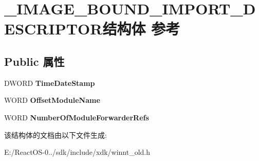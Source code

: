 \hypertarget{struct___i_m_a_g_e___b_o_u_n_d___i_m_p_o_r_t___d_e_s_c_r_i_p_t_o_r}{}\section{\+\_\+\+I\+M\+A\+G\+E\+\_\+\+B\+O\+U\+N\+D\+\_\+\+I\+M\+P\+O\+R\+T\+\_\+\+D\+E\+S\+C\+R\+I\+P\+T\+O\+R结构体 参考}
\label{struct___i_m_a_g_e___b_o_u_n_d___i_m_p_o_r_t___d_e_s_c_r_i_p_t_o_r}
\subsection*{Public 属性}
\begin{DoxyCompactItemize}
\item 
\mbox{\label{struct___i_m_a_g_e___b_o_u_n_d___i_m_p_o_r_t___d_e_s_c_r_i_p_t_o_r_ab76061e6a762b3f11912cbdf84bc8259}} 
D\+W\+O\+RD {\bfseries Time\+Date\+Stamp}
\item 
\mbox{\label{struct___i_m_a_g_e___b_o_u_n_d___i_m_p_o_r_t___d_e_s_c_r_i_p_t_o_r_ac7d5f6c0c46b58ae340d63157cafbaaf}} 
W\+O\+RD {\bfseries Offset\+Module\+Name}
\item 
\mbox{\label{struct___i_m_a_g_e___b_o_u_n_d___i_m_p_o_r_t___d_e_s_c_r_i_p_t_o_r_af87efe0dbbb141035c770799f0ca8751}} 
W\+O\+RD {\bfseries Number\+Of\+Module\+Forwarder\+Refs}
\end{DoxyCompactItemize}


该结构体的文档由以下文件生成\+:\begin{DoxyCompactItemize}
\item 
E\+:/\+React\+O\+S-\/0../sdk/include/xdk/winnt\+\_\+old.\+h\end{DoxyCompactItemize}
